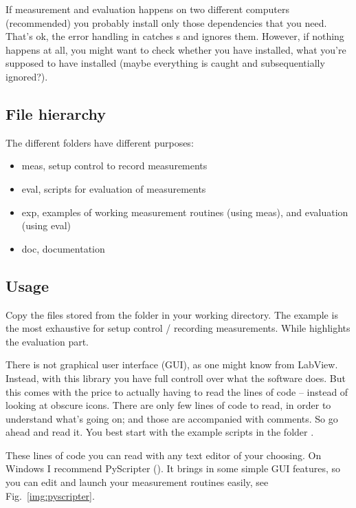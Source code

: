 If measurement and evaluation happens on two different computers (recommended)
you probably install only those dependencies that you need.
That's ok, the error handling in 
catches s and ignores them.
However, if nothing happens at all,
you might want to check whether you have installed,
what you're supposed to have installed
(maybe everything is caught and subsequentially ignored?).

\subsection{File hierarchy}

The different folders have different purposes:
\begin{itemize}
  \item meas, setup control to record measurements
  \item eval, scripts for evaluation of measurements
  \item exp, examples of working measurement routines (using meas), and evaluation (using eval)
  \item doc, documentation
\end{itemize}

\subsection{Usage}

Copy the files stored from the folder  in your working directory.
The example  is the most exhaustive for setup control / recording measurements.
While  highlights the evaluation part.

There is not graphical user interface (GUI),
as one might know from LabView.
Instead, with this library
you have full controll over
what the software does.
But this comes with the price
to actually having to read the lines of code --
instead of looking at obscure icons.
There are only few lines of code
to read,
in order to understand what's going on;
and those are accompanied with comments.
So go ahead and read it.
You best start with the example scripts in the folder .

These lines of code
you can read with any text editor
of your choosing.
On Windows I recommend PyScripter ().
It brings in some simple GUI features,
so you can edit and launch your measurement routines easily,
see Fig.~\ref{img:pyscripter}.

